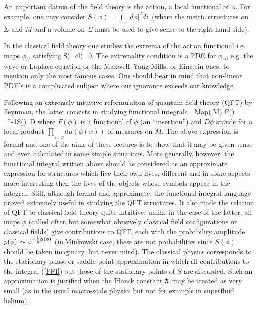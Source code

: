 An important datum of the field theory is the action, a
local functional of $\phi$. For example, one may consider
$S(\phi)=\int_{_\Sigma}|d\phi|^2 dv$ (where the metric
structures on $\Sigma$ and $M$ and a volume on $\Sigma$
must be used to give sense to the right hand side).
\vskip 0.3cm

In the classical field theory one studies the extrema of
the action functional i.e. maps $\phi_{cl}$ satisfying
\qq
\delta S(\phi_{cl})=0\s.
\non
\qqq
The extremality condition is a PDE for $\phi_{cl}$, e.g.
the wave or Laplace equation or the Maxwell, Yang-Mills,
or Einstein ones, to mention only the most famous cases.
One should bear in mind that non-linear PDE's is
a complicated subject where our ignorance exceeds our
knowledge.
\vskip 0.3cm

Following an extremely intuitive reformulation of quantum
field theory (QFT) by Feynman, the latter consists
in studying functional integrals
\qq
\int\limits_{Map(\Sigma,M)} F(\phi)
\ \ee^{-{1\over\hh}S(\phi)}\ D\phi
\label{FFI}
\qqq
where $F(\phi)$ is a functional of $\phi$ (an ``insertion'')
and $D\phi$ stands for a local product $\prod_{_{
x\in\Sigma}}d\mu(\phi(x))$ of measures on $M$. The above expression
is formal and one of the aims of these lectures
is to show that it may be given sense and even calculated
in some simple situations. More generally, however,
the functional integral written above should be considered
as an approximate expression for structures which live their
own lives, different and in some aspects more interesting
then the lives of the objects whose symbols appear in
the integral. Still, although formal and approximate,
the functional integral language proved extremely useful
in studying the QFT structures. It also made the relation
of QFT to classical field theory quite intuitive: unlike in
the case of the latter, all maps $\phi$ (called often
but somewhat abusively classical field configurations or
classical fields) give contributions to QFT, each with
the probability amplitude $p(\phi)\s\sim\s
\ee^{-{1\over\hh}S(\phi)}$ (in Minkowski case,
these are not probabilities since $S(\phi)$ should
be taken imaginary, but never mind). The classical physics
corresponds to the stationary phase or saddle point approximation
in which all contributions to the integral (\ref{FFI}) but those
of the stationary points of $S$ are discarded. Such an approximation
is justified when the Planck constant $\hh$ may be treated as very
small (as in the usual macro-scale physics but not for example in
superfluid helium).
\vskip 0.3cm


